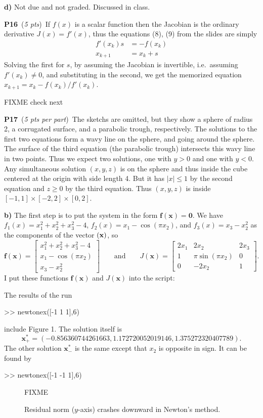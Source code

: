 \documentclass[11pt]{amsart}
\newcommand{\bbf}{\mathbf{f}}
\newcommand{\bx}{\mathbf{x}}
\newcommand{\bzero}{\mathbf{0}}
\newcommand{\mfile}[2]{
\bigskip
\begin{quote}
\medskip
\VerbatimInput[frame=single,framesep=3mm,label=\fbox{\normalsize \textsl{\,#1\,}},fontfamily=courier,fontsize=\scriptsize]{#2}
\medskip
\end{quote}
}
\newcommand{\probpts}[2]{\bigskip\noindent\large \textbf{#1} \normalsize \,(\emph{#2})\,}
\newcommand{\epart}[1]{\medskip\noindent\textbf{#1)}}
\begin{document}
\epart{d}  Not due and not graded.  Discussed in class.


\clearpage\newpage
\probpts{P16}{5 pts}  If $f(x)$ is a scalar function then the Jacobian is the ordinary derivative $J(x) = f'(x)$, thus the equations (8), (9) from the slides are simply
\begin{align*}
f'(x_k) s &= -f(x_k) \\
x_{k+1} &= x_k + s
\end{align*}
Solving the first for $s$, by assuming the Jacobian is invertible, i.e.~assuming $f'(x_k)\ne 0$, and substituting in the second, we get the memorized equation $x_{k+1} = x_k - f(x_k) / f'(x_k)$.



FIXME check next

\probpts{P17}{5 pts per part}  The sketchs are omitted, but they show a sphere of radius 2, a corrugated surface, and a parabolic trough, respectively.  The solutions to the first two equations form a wavy line on the sphere, and going around the sphere.  The surface of the third equation (the parabolic trough) intersects this wavy line in two points.  Thus we expect two solutions, one with $y>0$ and one with $y<0$.  Any simultaneous solution $(x,y,z)$ is on the sphere and thus inside the cube centered at the origin with side length 4.  But it has $|x|\le 1$ by the second equation and $z\ge 0$ by the third equation.  Thus $(x,y,z)$ is inside $[-1,1]\times [-2,2] \times [0,2]$.

\epart{b}  The first step is to put the system in the form $\bbf(\bx)=\bzero$.  We have $f_1(x) = x_1^2 + x_2^2 + x_3^2 - 4$, $f_2(x) = x_1 - \cos(\pi x_2)$, and $f_3(x) = x_3 - x_2^2$ as the components of the vector $\bf(\bx)$, so
  $$\bbf(\bx) = \begin{bmatrix} x_1^2 + x_2^2 + x_3^2 - 4 \\ x_1 - \cos(\pi x_2) \\ x_3 - x_2^2 \end{bmatrix} \qquad \text{and} \qquad J(\bx) = \begin{bmatrix} 2 x_1 & 2 x_2 & 2 x_3 \\ 1 & \pi \sin(\pi x_2) & 0 \\ 0 & -2 x_2 & 1 \end{bmatrix}.$$
I put these functions $\bbf(\bx)$ and $J(\bx)$ into the script:

\mfile{newtonex.m}{newtonex.m}

The results of the run
\begin{mVerb}
>> newtonex([-1 1 1],6)
\end{mVerb}
include Figure 1.  The solution itself is
    $$\bx_+^* = (-0.856360744261663, 1.172720052019146, 1.375272320407789).$$
The other solution $\bx_-^*$ is the same except that $x_2$ is opposite in sign.  It can be found by
\begin{mVerb}
>> newtonex([-1 -1 1],6)
\end{mVerb}

\begin{figure}[ht]
FIXME %
\caption{Residual norm ($y$-axis) crashes downward in Newton's method.}
\end{figure}
\end{document}
